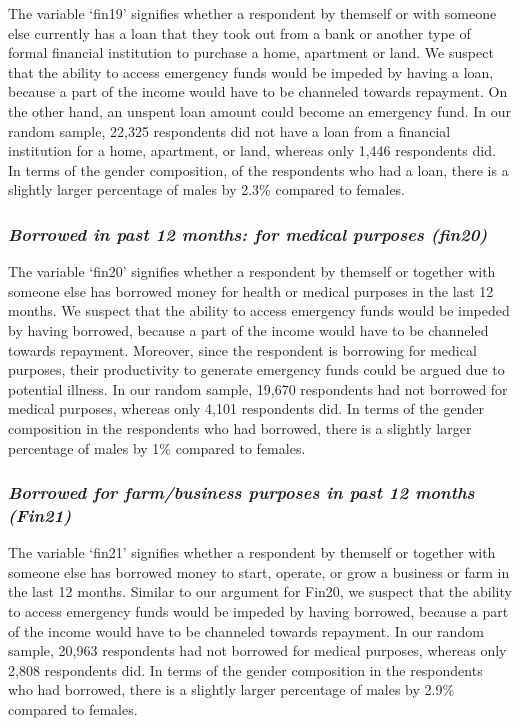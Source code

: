 \documentclass[12pt]{article}
\begin{document}
The variable `fin19' signifies whether a respondent by themself or with
someone else currently has a loan that they took out from a bank or
another type of formal financial institution to purchase a home,
apartment or land. We suspect that the ability to access emergency funds
would be impeded by having a loan, because a part of the income would
have to be channeled towards repayment. On the other hand, an unspent
loan amount could become an emergency fund. In our random sample, 22,325
respondents did not have a loan from a financial institution for a home,
apartment, or land, whereas only 1,446 respondents did. In terms of the
gender composition, of the respondents who had a loan, there is a
slightly larger percentage of males by 2.3\% compared to females.

\hypertarget{borrowed-in-past-12-months-for-medical-purposes-fin20}{%
\subsubsection{\texorpdfstring{\emph{Borrowed in past 12 months: for
medical purposes
(fin20)}}{Borrowed in past 12 months: for medical purposes (fin20)}}\label{borrowed-in-past-12-months-for-medical-purposes-fin20}}

The variable `fin20' signifies whether a respondent by themself or
together with someone else has borrowed money for health or medical
purposes in the last 12 months. We suspect that the ability to access
emergency funds would be impeded by having borrowed, because a part of
the income would have to be channeled towards repayment. Moreover, since
the respondent is borrowing for medical purposes, their productivity to
generate emergency funds could be argued due to potential illness. In
our random sample, 19,670 respondents had not borrowed for medical
purposes, whereas only 4,101 respondents did. In terms of the gender
composition in the respondents who had borrowed, there is a slightly
larger percentage of males by 1\% compared to females.

\hypertarget{borrowed-for-farmbusiness-purposes-in-past-12-months-fin21}{%
\subsubsection{\texorpdfstring{\emph{Borrowed for farm/business purposes
in past 12 months
(Fin21)}}{Borrowed for farm/business purposes in past 12 months (Fin21)}}\label{borrowed-for-farmbusiness-purposes-in-past-12-months-fin21}}

The variable `fin21' signifies whether a respondent by themself or
together with someone else has borrowed money to start, operate, or grow
a business or farm in the last 12 months. Similar to our argument for
Fin20, we suspect that the ability to access emergency funds would be
impeded by having borrowed, because a part of the income would have to
be channeled towards repayment. In our random sample, 20,963 respondents
had not borrowed for medical purposes, whereas only 2,808 respondents
did. In terms of the gender composition in the respondents who had
borrowed, there is a slightly larger percentage of males by 2.9\%
compared to females.
\end{document}
